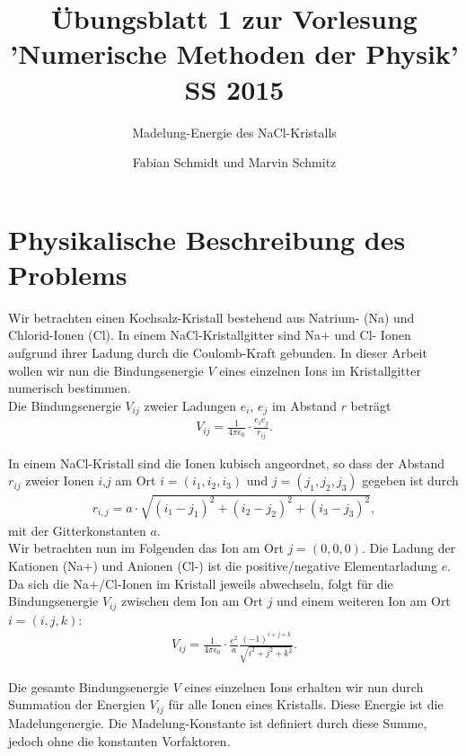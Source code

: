 \documentclass[ngerman]{scrartcl}
\begin{document}
\title{Übungsblatt 1 zur Vorlesung 'Numerische Methoden der Physik' SS 2015}
\subtitle{Madelung-Energie des NaCl-Kristalls}
\author{Fabian Schmidt und Marvin Schmitz}
\maketitle

\newpage

\section*{Physikalische Beschreibung des Problems}
Wir betrachten einen Kochsalz-Kristall bestehend aus Natrium- (Na) und Chlorid-Ionen (Cl).
In einem NaCl-Kristallgitter sind Na+ und Cl- Ionen aufgrund ihrer Ladung durch die Coulomb-Kraft gebunden.
In dieser Arbeit wollen wir nun die Bindungsenergie $V$ eines einzelnen Ions im Kristallgitter numerisch bestimmen.\\

Die Bindungsenergie $V_{ij}$ zweier Ladungen $e_i$, $e_j$ im Abstand $r$ beträgt
\begin{align*}
	V_{ij} = \frac{1}{4\pi \epsilon_0} \cdot \frac{e_ie_j}{r_{ij}}.
\end{align*}

In einem NaCl-Kristall sind die Ionen kubisch angeordnet, so dass der Abstand $r_{ij}$ zweier Ionen $i$,$j$ am Ort 
$i = (i_1,i_2,i_3)$ und $j = (j_1,j_2,j_3)$ gegeben ist durch
\begin{align*}
	r_{i,j} = a\cdot \sqrt{(i_1-j_1)^2+(i_2-j_2)^2+(i_3-j_3)^2},
\end{align*}
mit der Gitterkonstanten $a$.\\

Wir betrachten nun im Folgenden das Ion am Ort $j = (0,0,0)$.
Die Ladung der Kationen (Na+) und Anionen (Cl-) ist die positive/negative Elementarladung $e$.
Da sich die Na+/Cl-Ionen im Kristall jeweils abwechseln, folgt für die Bindungsenergie $V_{ij}$
zwischen dem Ion am Ort $j$ und einem weiteren Ion am Ort $i = (i,j,k)$:
\begin{align*}
	V_{ij} = \frac{1}{4\pi \epsilon_0} \cdot \frac{e^2}{a} \frac{(-1)^{i+j+k}}{\sqrt{i^2+j^2+k^2}}.
\end{align*}

Die gesamte Bindungsenergie $V$ eines einzelnen Ions erhalten wir nun durch Summation der Energien $V_{ij}$
für alle Ionen eines Kristalls. Diese Energie ist die Madelungenergie.
Die Madelung-Konstante ist definiert durch diese Summe, jedoch ohne die konstanten Vorfaktoren.
\end{document}

